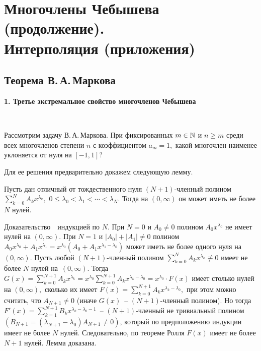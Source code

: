 
\chapter{Многочлены Чебышева (продолжение).\\ {Интерполяция (приложения)}}  %

{\section{Теорема В.\,А.\,Маркова }}

{\bf 1. Третье экстремальное свойство многочленов Чебышева}

\ \

Рассмотрим задачу В.\,А.\,Маркова. При фиксированных {$m\in \mathbb{N}$ и $n \ge m$}
среди всех многочленов степени
{$n$ с коэффициентом} $a_m=1,$ какой многочлен наименее
уклоняется от нуля {на $[-1,1]$}?


Для ее решения предварительно докажем следующую лемму.

\begin{lemma}\label{l2-3}
Пусть дан {отличный от тождественного нуля} $(N+1)$-членный полином
$\sum\limits_{k=0}^{N}A_kx^{\lambda_k},$ $0 \le \lambda_0 < \lambda_1 < \cdots <
\lambda_N.$ Тогда на $(0,\infty )$ он может иметь не более $N$ нулей.
\end{lemma}

Д\;о\;к\;а\;з\;а\;т\;е\;л\;ь\;с\;т\;в\;о\ \ индукцией по $N.$
При $N=0$ {и $A_0 \ne 0$} {полином} $A_0 x^{\lambda_0}$
не имеет нулей на $(0, \infty ).$ При $N=1$ {и $|A_0|+|A_1|
\ne 0$ полином} $A_0 x^{\lambda_0}+A_1
x^{\lambda_1}=x^{\lambda_0}
                                   (A_0+A_1 x^{\lambda_1-\lambda_0})$
может иметь не более одного нуля на~$(0,\infty).$ Пусть
{любой $(N+1)$-членный полином
$\sum\limits_{k=0}^{N}A_kx^{\lambda_k} \not \equiv 0$ } имеет
не более $N$ нулей на~$(0, \infty).$ Тогда
{$G(x)=\sum\limits_{k=0}^{N+1}A_kx^{\lambda_k}=
                        x^{\lambda_0}\sum\limits_{k=0}^{N+1}A_kx^{\lambda_k-\lambda_0}=
                        x^{\lambda_0}\cdot F(x)$}
имеет столько нулей на $(0, \infty ),$ сколько их имеет
$F(x)=\sum\limits_{k=0}^{N+1}A_kx^{\lambda_k-\lambda_0},$
при этом можно считать, что $A_{N+1} \ne 0$ {(иначе
$G(x)$~-- $(N+1)$-членный полином).} Но {тогда}
$F'(x)=\sum\limits_{k=1}^{N+1}B_kx^{\lambda_k-\lambda_0-1}$~-- {$(N+1)$}-членный
{не тривиальный} полином
{$(B_{N+1}=(\lambda_{N+1}-\lambda_0) A_{N+1}\ne 0)$}, который по
предположению индукции имеет не более $N$ нулей. Следовательно,
{по теореме Ролля} $F(x)$ имеет не более $N+1$ нулей. Лемма
доказана. %

